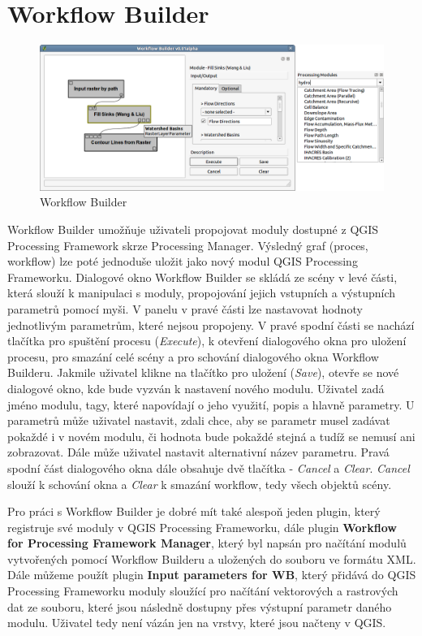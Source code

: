 \newpage
\chapter{Workflow Builder}

\begin{figure}[h]
	\centering
	\includegraphics[scale=0.38]{pictures/wf/wf_pm}
	\caption{Workflow Builder}
  	\label{wf}
\end{figure}

Workflow Builder umožňuje uživateli propojovat moduly dostupné z QGIS
Processing Framework skrze Processing Manager. Výsledný graf (proces,
workflow) lze poté jednoduše uložit jako nový modul QGIS Processing
Frameworku. Dialogové okno Workflow Builder se skládá ze scény v levé
části, která slouží k manipulaci s moduly, propojování jejich
vstupních a výstupních parametrů pomocí myši. V panelu v pravé části
lze nastavovat hodnoty jednotlivým parametrům, které nejsou
propojeny. V pravé spodní části se nachází tlačítka pro spuštění
procesu (\textit{Execute}), k otevření dialogového okna pro uložení
procesu, pro smazání celé scény a pro schování dialogového okna
Workflow Builderu. Jakmile uživatel klikne na tlačítko pro uložení
(\textit{Save}), otevře se nové dialogové okno, kde bude vyzván k
nastavení nového modulu. Uživatel zadá jméno modulu, tagy, které
napovídají o jeho využití, popis a hlavně parametry. U parametrů může
uživatel nastavit, zdali chce, aby se parametr musel zadávat pokaždé i
v novém modulu, či hodnota bude pokaždé stejná a tudíž se nemusí ani
zobrazovat. Dále může uživatel nastavit alternativní název
parametru. Pravá spodní část dialogového okna dále obsahuje dvě
tlačítka - \textit{Cancel} a \textit{Clear}. \textit{Cancel} slouží k
schování okna a \textit{Clear} k smazání workflow, tedy všech objektů
scény.

Pro práci s Workflow Builder je dobré mít také alespoň jeden plugin,
který registruje své moduly v QGIS Processing Frameworku, dále
plugin \textbf{Workflow for Processing Framework Manager}, který byl
napsán pro načítání modulů vytvořených pomocí Workflow Builderu a
uložených do souboru ve formátu XML. Dále můžeme použít
plugin \textbf{Input parameters for WB}, který přidává do QGIS
Processing Frameworku moduly sloužící pro načítání vektorových a
rastrových dat ze souboru, které jsou následně dostupny přes výstupní
parametr daného modulu. Uživatel tedy není vázán jen na vrstvy, které
jsou načteny v QGIS.\\

